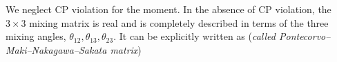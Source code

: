 We neglect CP violation for the moment. In the absence of CP violation, the \(3\times 3\) mixing matrix is real and is completely described in terms of the three mixing angles, \(\theta _{12}, \theta _{13},\theta _{23}\). It can be explicitly written as (\textit{called Pontecorvo–Maki–Nakagawa–Sakata matrix})


